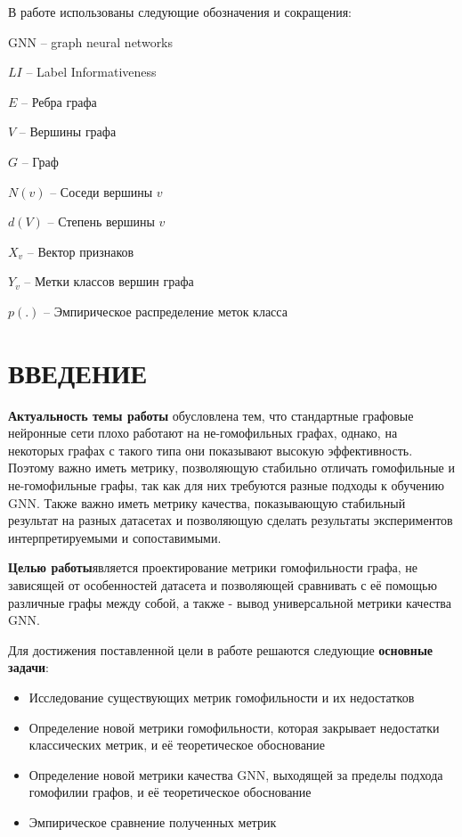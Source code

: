 \documentclass[a4paper,14pt]{article}
\begin{document}
	В работе  использованы следующие обозначения и сокращения:
	
	GNN	–	graph neural networks
	
	$LI$	–	Label Informativeness
	
	$E$	–	Ребра графа
	
	$V$	–	Вершины графа
	
	$G$	–	Граф
	
	$N(v)$	–	Соседи вершины $v$
	
	$d(V)$	–	Степень вершины $v$
	
	$X_v$	–	Вектор признаков
	
	$Y_v$	–	Метки классов вершин графа
	
	$p(.)$	–	Эмпирическое распределение меток класса
	
	\newpage
	
	\section*{ \hfill ВВЕДЕНИЕ \hfill}
	
	\textbf{Актуальность темы работы} обусловлена тем, что стандартные графовые нейронные сети плохо работают на не-гомофильных графах, однако, на некоторых графах с такого типа они показывают высокую эффективность.
	Поэтому важно иметь метрику, позволяющую стабильно отличать гомофильные и не-гомофильные графы, так как для них требуются разные подходы к обучению GNN.
	Также важно иметь метрику качества, показывающую стабильный результат на разных датасетах и позволяющую сделать результаты экспериментов интерпретируемыми и сопоставимыми.
	
	\textbf{Целью работы}является проектирование метрики гомофильности графа, не зависящей от особенностей датасета и позволяющей сравнивать с её помощью различные графы между собой, а также - вывод универсальной метрики качества GNN.
	
	
	Для достижения поставленной цели в работе решаются следующие \textbf{основные задачи}:
	
	\begin{itemize}
		
	\item Исследование существующих метрик гомофильности и их недостатков
	
	\item Определение новой метрики гомофильности, которая закрывает недостатки классических метрик, и её теоретическое обоснование
	
	\item Определение новой метрики качества GNN, выходящей за пределы подхода гомофилии графов, и её теоретическое обоснование
	
	\item Эмпирическое сравнение полученных метрик
	
	\end{itemize}
	
\end{document}

